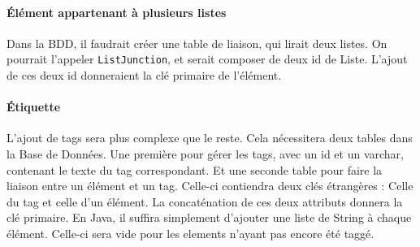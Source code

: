 \documentclass[12pt, a4paper]{article}
\begin{document}
\paragraph{Élément appartenant à plusieurs listes}
Dans la BDD, il faudrait créer une table de liaison, qui lirait deux listes. On pourrait l'appeler \verb|ListJunction|, et serait composer de deux id de Liste. L'ajout de ces deux id donneraient la clé primaire de l'élément.

\paragraph{Étiquette} L'ajout de tags sera plus complexe que le reste. Cela nécessitera deux tables dans la Base de Données. Une première pour gérer les tags, avec un id et un varchar, contenant le texte du tag correspondant. Et une seconde table pour faire la liaison entre un élément et un tag. Celle-ci contiendra deux clés étrangères : Celle du tag et celle d'un élément. La concaténation de ces deux attributs donnera la clé primaire. En Java, il suffira simplement d'ajouter une liste de String à chaque élément. Celle-ci sera vide pour les elements n'ayant pas encore été taggé.
\end{document}
